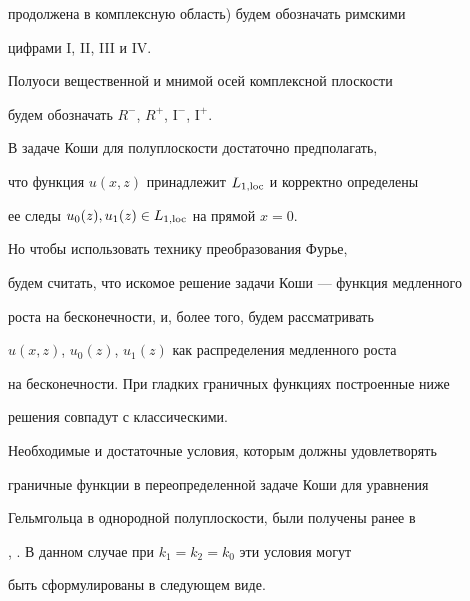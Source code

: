 продолжена в комплексную область) будем обозначать римскими


цифрами I, II, III и IV.


Полуоси вещественной и мнимой осей комплексной плоскости


будем обозначать $R^-$, $R^+$, $\mathrm I^-$, $\mathrm I^+$.





В задаче Коши для полуплоскости достаточно предполагать,


что функция $u(x,z)$ принадлежит $L_{1,\operatorname{loc}}$ и корректно определены


ее следы $u_0(z), u_1(z)\in L_{1,\operatorname{loc}}$ на прямой $x=0$.


Но чтобы использовать технику преобразования Фурье,


будем считать, что искомое решение задачи Коши --- функция медленного


роста на бесконечности, и, более того, будем рассматривать


$u(x,z)$, $u_0(z)$, $u_1(z)$ как распределения медленного роста


на бесконечности. При гладких граничных функциях построенные ниже


решения совпадут с классическими.





Необходимые и достаточные условия, которым должны удовлетворять


граничные функции в переопределенной задаче Коши для уравнения


Гельмгольца в однородной полуплоскости, были получены ранее в


\cite{MMET}, \cite{Cauchy}. В данном случае при $k_1=k_2=k_0$ эти условия могут


быть сформулированы в следующем виде.





